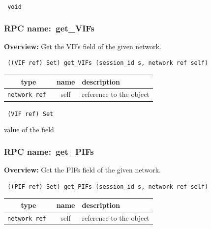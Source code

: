 {\tt 
void
}



\vspace{0.3cm}
\vspace{0.3cm}
\vspace{0.3cm}
\subsubsection{RPC name:~get\_VIFs}

{\bf Overview:} 
Get the VIFs field of the given network.

\begin{verbatim} ((VIF ref) Set) get_VIFs (session_id s, network ref self)\end{verbatim}



 
\vspace{0.3cm}
\begin{tabular}{|c|c|p{7cm}|}
 \hline
{\bf type} & {\bf name} & {\bf description} \\ \hline
{\tt network ref } & self & reference to the object \\ \hline 

\end{tabular}

\vspace{0.3cm}

{\tt 
(VIF ref) Set
}


value of the field
\vspace{0.3cm}
\vspace{0.3cm}
\vspace{0.3cm}
\subsubsection{RPC name:~get\_PIFs}

{\bf Overview:} 
Get the PIFs field of the given network.

\begin{verbatim} ((PIF ref) Set) get_PIFs (session_id s, network ref self)\end{verbatim}



 
\vspace{0.3cm}
\begin{tabular}{|c|c|p{7cm}|}
 \hline
{\bf type} & {\bf name} & {\bf description} \\ \hline
{\tt network ref } & self & reference to the object \\ \hline 

\end{tabular}

